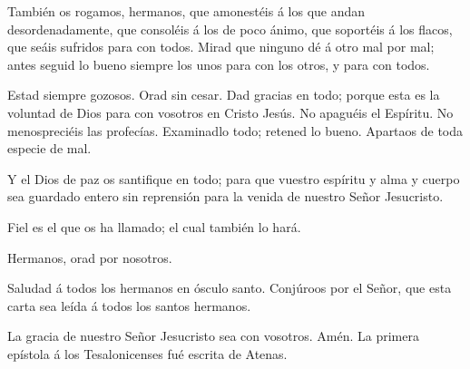  También os rogamos, hermanos, que amonestéis á los que
andan desordenadamente, que consoléis á los de poco ánimo, que soportéis
á los flacos, que seáis sufridos para con todos.  Mirad que
ninguno dé á otro mal por mal; antes seguid lo bueno siempre los unos
para con los otros, y para con todos.

 Estad siempre gozosos.  Orad sin cesar.
 Dad gracias en todo; porque esta es la voluntad de Dios
para con vosotros en Cristo Jesús.  No apaguéis el
Espíritu.  No menospreciéis las profecías. 
Examinadlo todo; retened lo bueno.  Apartaos de toda
especie de mal.

 Y el Dios de paz os santifique en todo; para que vuestro
espíritu y alma y cuerpo sea guardado entero sin reprensión para la
venida de nuestro Señor Jesucristo.

 Fiel es el que os ha llamado; el cual también lo hará.

 Hermanos, orad por nosotros.

 Saludad á todos los hermanos en ósculo santo.
 Conjúroos por el Señor, que esta carta sea leída á todos
los santos hermanos.

 La gracia de nuestro Señor Jesucristo sea con vosotros.
Amén. La primera epístola á los Tesalonicenses fué escrita de Atenas.
